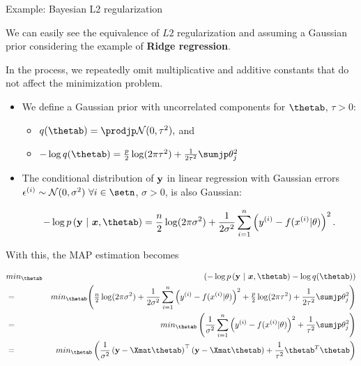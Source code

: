 \begin{vbframe}{Example: Bayesian L2 regularization}

\small

We can easily see the equivalence of $L2$ regularization and assuming a Gaussian
prior considering the example of \textbf{Ridge regression}.

\vfill

In the process, we repeatedly omit multiplicative and additive constants that 
do not affect the minimization problem.

\vfill

\begin{itemize}

  \small
  \item We define a Gaussian prior with uncorrelated components for $\thetab$, 
  $\tau > 0$:
  \begin{itemize}
    \footnotesize
    \item $q(\thetab) = \prodjp \mathcal{N}(0, \tau^2),$ and 
    \item $- \log q(\thetab) = \frac{p}{2} \log(2\pi \tau^2) + \frac{1}{2\tau^2} 
    \sumjp \theta_j^2$
  \end{itemize}
  
  \item The conditional distribution of $\mathbf{y}$ in linear regression with 
  Gaussian errors $\epsilon^{(i)} \sim \mathcal{N}(0, \sigma^2) ~ \forall i \in 
  \setn$, $\sigma > 0$, is also Gaussian: 
  \begin{footnotesize}
  $$- \log p\left(\ydat ~|~ \xv, \thetab\right) = \frac{n}{2} \log (2\pi 
  \sigma^2) + \frac{1}{2\sigma^2} \sumin \left(\yi - \fxit \right)^2.$$
  \end{footnotesize}
  
\end{itemize}

\framebreak
\small

With this, the MAP estimation becomes

\begin{scriptsize}

\begin{eqnarray*}
&min_{\thetab}& \left(
- \log p\left(\ydat ~|~ \xv, \thetab\right) - \log q(\thetab)
\right) \\
&=& min_{\thetab} \Bigg(
\tfrac{n}{2} \log (2\pi \sigma^2) + \frac{1}{2\sigma^2} \sumin \left(\yi - 
\fxit \right)^2 + \tfrac{p}{2} \log(2\pi \tau^2) + 
\frac{1}{2\tau^2} \sumjp \theta_j^2
\Bigg) \\
&=& min_{\thetab} \left( \frac{1}{\sigma^2} \sumin \left(\yi -
\fxit \right)^2 + \frac{1}{\tau^2} \sumjp \theta_j^2 \right) \\
&=& min_{\thetab} \left(
\frac{1}{\sigma^2} \left(\ydat - \Xmat \thetab\right)^\top \left(\ydat - \Xmat
\thetab\right) + \frac{1}{\tau^2} {\thetab}^T\thetab
\right)
\end{eqnarray*}


\end{scriptsize}
\end{vbframe}
